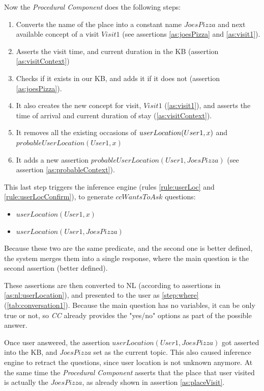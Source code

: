 Now the \emph{Procedural Component} does the following steps:
\begin{enumerate}
\item Converts the name of the place into a constant name $JoesPizza$ and next
available concept of a visit $Visit1$ (see assertions \ref{as:joesPizza} and
\ref{as:visit1}).
\item Asserts the visit time, and current duration in the KB (assertion 
\ref{as:visitContext})
\item Checks if it exists in our KB, and adds it if it does not (assertion 
\ref{as:joesPizza}). 
\item It also creates the new concept for visit, $Visit1$ (\ref{as:visit1}),
and asserts the time of arrival and current duration of stay 
(\ref{as:visitContext}).
\item It removes all the existing occasions of $\\userLocation(User1,x)$ and 
$probableUserLocation(User1,x)$
\item It adds a new assertion $probableUserLocation(User1,JoesPizza)$ 
(see assertion \ref{as:probableContext}).
\end{enumerate}
This last step triggers the inference engine (rules \ref{rule:userLoc} and
\ref{rule:userLocConfirm}), to generate $ccWantsToAsk$ questions:
\begin{itemize}
\item $userLocation(User1,x)$
\item $userLocation(User1,JoesPizza)$
\end{itemize}
Because these two are the same predicate, and the second one is better defined,
the system merges them into a single response, where the main question is the
second assertion (better defined). 

These assertions are then converted to NL (according to assertions in 
\ref{as:nl:userLocation}), and presented to the user as \autoref{step:where} 
(\autoref{tab:conversation1}). Because the main question has no variables, it
can be only true or not, so \emph{CC} already provides the "yes/no" options
as part of the possible answer.

Once user answered, the assertion $userLocation(User1,JoesPizza)$ got 
asserted into the KB, and $JoesPizza$ set as the current topic. This 
also caused inference engine to retract the 
questions, since user location is not unknown anymore. At the same time the
\emph{Procedural Component}  asserts that the place that user visited is
actually the $JoesPizza$, as already shown in assertion \ref{as:placeVisit}.

